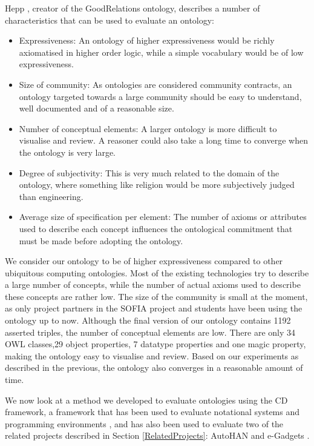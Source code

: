 Hepp \cite{Hepp2007}, creator of the GoodRelations ontology, describes a number of characteristics that can be used to evaluate an ontology:

\begin{itemize}
	\item Expressiveness: An ontology of higher expressiveness would be richly axiomatised in higher order logic, while a simple vocabulary would be of low expressiveness.
	\item Size of community: As ontologies are considered community contracts,  an ontology targeted towards a large community should be easy to understand, well documented and of a reasonable size.
	\item Number of conceptual elements: A larger ontology is more difficult to visualise and review. A reasoner could also take a long time to converge when the ontology is very large.
	\item Degree of subjectivity: This is very much related to the domain of the ontology, where something like religion would be more subjectively judged than engineering.
	\item Average size of specification per element: The number of axioms or attributes used to describe each concept influences the ontological commitment\label{OntologicalCommitment} that must be made before adopting the ontology. %
\end{itemize}

We consider our ontology to be of higher expressiveness compared to other ubiquitous computing ontologies. Most of the existing technologies try to describe a large number of concepts, while the number of actual axioms used to describe these concepts are rather low. The size of the community is small at the moment, as only project partners in the \ac{SOFIA} project and students have been using the ontology up to now. Although the final version of our ontology contains 1192 asserted triples, the number of conceptual elements are low. There are only 34 \ac{OWL} classes,29 object properties, 7 datatype properties and one magic property, making the ontology easy to visualise and review. Based on our experiments as described in the previous, the ontology also converges in a reasonable amount of time.

We now look at a method we developed to evaluate ontologies using the \ac{CD} framework, a framework that has been used to evaluate notational systems and programming environments \cite{Green1996}, and has also been used to evaluate two of the related projects described in Section \ref{RelatedProjects}: AutoHAN \cite{Blackwell2001} and e-Gadgets \cite{Mavrommati2004}.

